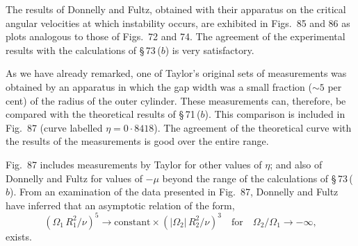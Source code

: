 The results of Donnelly and Fultz, obtained with their apparatus on
the critical angular velocities at which instability occurs, are exhibited
in Figs.~85 and 86 as plots analogous to those of Figs.~72 and 74.  The
agreement of the experimental results with the calculations of \S\,73\,($b$)
is very satisfactory.


As we have already remarked, one of Taylor's original sets of measurements
was obtained by an apparatus in which the gap width was a small
fraction ($\sim\!5$ per cent) of the radius of the outer cylinder.  These measurements
can, therefore, be compared with the theoretical results of \S\,71\,($b$).
This comparison is included in Fig.~87 (curve labelled $\eta = 0{\cdot}8418$).
The agreement of the theoretical curve with the results of the measurements
is good over the entire range.

Fig.~87 includes measurements by Taylor for other values of $\eta$; and
also of Donnelly and Fultz for values of $-\mu$ beyond the range of the
calculations of \S\,73\,($b$).  From an examination of the data presented in
Fig.~87, Donnelly and Fultz have inferred that an asymptotic relation
of the form,
\begin{equation}\label{eq:7-336}
(\Omega_1\,R_1^2/\nu)^5 \to \text{constant}\times (|\Omega_2|\,R_2^2/\nu)^3
\quad\text{for}\quad \Omega_2/\Omega_1 \to -\infty,
\end{equation}
exists.


